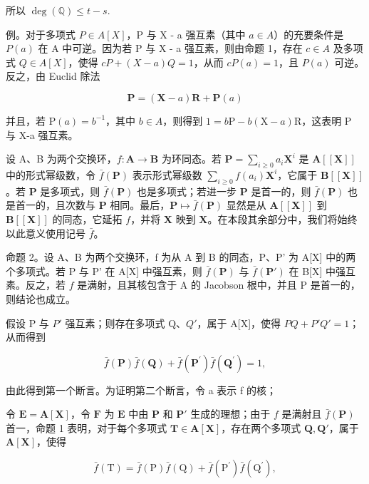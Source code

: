 所以 \(\deg (\mathbb{Q})\leqslant t - s.\)

例。对于多项式 \(P \in A[X]\)，P 与 X - a 强互素（其中 \(a \in A\)）的充要条件是 \(P(a)\) 在 A 中可逆。因为若 P 与 X - a 强互素，则由命题 1，存在 \(c \in A\) 及多项式 \(Q \in A[X]\)，使得 \(cP + (X - a)Q = 1\)，从而 \(cP(a) = 1\)，且 \(P(a)\) 可逆。反之，由 Euclid 除法

\[
\mathbf {P} = (\mathbf {X} - a) \mathbf {R} + \mathbf {P} (a)
\]

并且，若 \(\mathrm{P}(a)=b^{-1}\)，其中 \(b\in A\)，则得到 \(1=b\mathrm{P}-b(\mathrm{X}-a)\mathrm{R}\)，这表明 P 与 X-a 强互素。

设 A、B 为两个交换环，\(f\colon\mathbf{A}\to\mathbf{B}\) 为环同态。若 \(\mathbf{P}=\sum_{i\geqslant0}a_{i}\mathbf{X}^{i}\) 是 \(\mathbf{A}[[\mathbf{X}]]\) 中的形式幂级数，令 \(\bar{f}(\mathbf{P})\) 表示形式幂级数 \(\sum_{i\geqslant0}f(a_{i})\mathbf{X}^{i}\)，它属于 \(\mathbf{B}[[\mathbf{X}]]\)。若 \(\mathbf{P}\) 是多项式，则 \(\bar{f}(\mathbf{P})\) 也是多项式；若进一步 \(\mathbf{P}\) 是首一的，则 \(\bar{f}(\mathbf{P})\) 也是首一的，且次数与 \(\mathbf{P}\) 相同。最后，\(\mathbf{P}\mapsto\bar{f}(\mathbf{P})\) 显然是从 \(\mathbf{A}[[\mathbf{X}]]\) 到 \(\mathbf{B}[[\mathbf{X}]]\) 的同态，它延拓 \(f\)，并将 \(\mathbf{X}\) 映到 \(\mathbf{X}\)。在本段其余部分中，我们将始终以此意义使用记号 \(\bar{f}\)。

命题 2。设 A、B 为两个交换环，f 为从 A 到 B 的同态，P、P' 为 A{[}X{]} 中的两个多项式。若 P 与 P' 在 A{[}X{]} 中强互素，则 \(\bar{f}(\mathbf{P})\) 与 \(\bar{f}(\mathbf{P}')\) 在 B{[}X{]} 中强互素。反之，若 \(f\) 是满射，且其核包含于 A 的 Jacobson 根中，并且 P 是首一的，则结论也成立。

假设 P 与 \(P'\) 强互素；则存在多项式 Q、\(Q'\)，属于 A{[}X{]}，使得 \(PQ + P'Q' = 1\)；从而得到

\[
\bar {f} (\mathbf {P}) \bar {f} (\mathbf {Q}) + \bar {f} (\mathbf {P} ^ {\prime}) \bar {f} (\mathbf {Q} ^ {\prime}) = 1,
\]

由此得到第一个断言。为证明第二个断言，令 a 表示 f 的核；

令 \(\mathbf{E} = \mathbf{A}[\mathbf{X}]\)，令 \(\mathbf{F}\) 为 \(\mathbf{E}\) 中由 \(\mathbf{P}\) 和 \(\mathbf{P}'\) 生成的理想；由于 \(f\) 是满射且 \(\bar{f}(\mathbf{P})\) 首一，命题 1 表明，对于每个多项式 \(\mathbf{T} \in \mathbf{A}[\mathbf{X}]\)，存在两个多项式 \(\mathbf{Q}, \mathbf{Q}'\)，属于 \(\mathbf{A}[\mathbf{X}]\)，使得

\[
\bar {f} (\mathrm{T}) = \bar {f} (\mathrm{P}) \bar {f} (\mathrm{Q}) + \bar {f} (\mathrm{P} ^ {\prime}) \bar {f} (\mathrm{Q} ^ {\prime}),
\]

